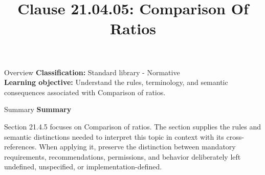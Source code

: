 \documentclass[10pt,letterpaper]{article}
\title{Clause 21.04.05: Comparison Of Ratios}
\author{}
\date{}
\begin{document}
\maketitle
\begin{CornellOverviewBox}{Overview}
\textbf{Classification:} Standard library - Normative\\[2pt]
\textbf{Learning objective:} Understand the rules, terminology, and semantic consequences associated with Comparison of ratios.
\end{CornellOverviewBox}\begin{CornellSummaryBox}{Summary}
{\sffamily\bfseries\color{Accent} Summary}\par\vspace{3pt}Section 21.4.5 focuses on Comparison of ratios. The section supplies the rules and semantic distinctions needed to interpret this topic in context with its cross-references. When applying it, preserve the distinction between mandatory requirements, recommendations, permissions, and behavior deliberately left undefined, unspecified, or implementation-defined.
\end{CornellSummaryBox}
\end{document}
